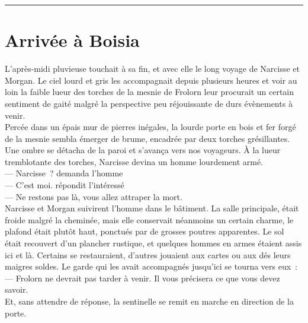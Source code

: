 \documentclass[french, a4paper, 12pt]{article}
\begin{document}
 \maketitle \vspace{3pt} \hrule \vspace{3pt}

\section{Arrivée à Boisia}
L'après-midi pluvieuse touchait à sa fin, et avec elle le long voyage de Narcisse et Morgan. Le ciel lourd et gris les accompagnait depuis plusieurs heures et voir au loin la faible lueur des torches de la mesnie de Frolorn leur procurait un certain sentiment de gaité malgré la perspective peu réjouissante de durs évènements à venir.\\

Percée dans un épais mur de pierres inégales, la lourde porte en bois et fer forgé de la mesnie sembla émerger de brume, encadrée par deux torches grésillantes. Une ombre se détacha de la paroi et s'avança vers nos voyageurs. À la lueur tremblotante des torches, Narcisse devina un homme lourdement armé.\\
--- Narcisse~? demanda l'homme\\
--- C'est moi. répondit l'intéressé\\
--- Ne restons pas là, vous allez attraper la mort.\\
Narcisse et Morgan suivirent l'homme dans le bâtiment. La salle principale, était froide malgré la cheminée, mais elle conservait néanmoins un certain charme, le plafond était plutôt haut, ponctués par de grosses poutres apparentes. Le sol était recouvert d'un plancher rustique, et quelques hommes en armes étaient assis ici et là. Certains se restauraient, d'autres jouaient aux cartes ou aux dés leurs maigres soldes. Le garde qui les avait accompagnés jusqu'ici se tourna vers eux~:\\
--- Frolorn ne devrait pas tarder à venir. Il vous précisera ce que vous devez savoir.\\
Et, sans attendre de réponse, la sentinelle se remit en marche en direction de la porte.\\
\end{document}
